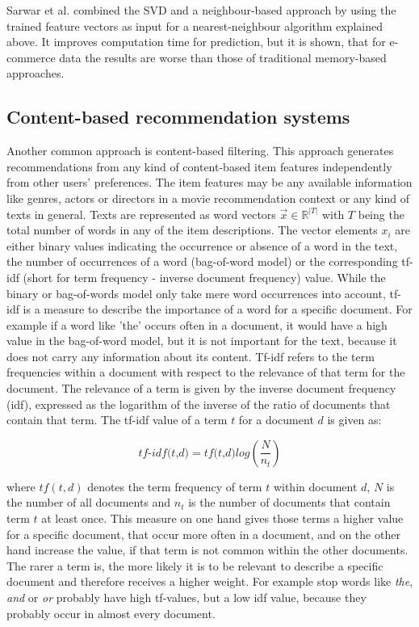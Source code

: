 \documentclass[10pt]{reportMaster}
\begin{document}
Sarwar et al. \cite{nnOnSvd} combined the SVD and a neighbour-based approach by using the trained feature vectors as input for a nearest-neighbour algorithm explained above.
It improves computation time for prediction, but it is shown, that for e-commerce data the results are worse than those of traditional memory-based approaches.



\subsection{Content-based recommendation systems}
\label{rs_cb}

Another common approach is content-based filtering.
This approach generates recommendations from any kind of content-based item features independently from other users' preferences.
The item features may be any available information like genres, actors or directors in a movie recommendation context or any kind of texts in general.
Texts are represented as word vectors $\vec{x} \in \mathds{R}^{|T|}$ with $T$ being the total number of words in any of the item descriptions.
The vector elements $x_i$ are either binary values indicating the occurrence or absence of a word in the text, the number of occurrences of a word (bag-of-word model) or the corresponding tf-idf (short for term frequency - inverse document frequency) value.
While the binary or bag-of-words model only take mere word occurrences into account, tf-idf is a measure to describe the importance of a word for a specific document.
For example if a word like 'the' occurs often in a document, it would have a high value in the bag-of-word model, but it is not important for the text, because it does not carry any information about its content.
Tf-idf refers to the term frequencies within a document with respect to the relevance of that term for the document.
The relevance of a term is given by the inverse document frequency (idf), expressed as the logarithm of the inverse of the ratio of documents that contain that term.
The tf-idf value of a term $t$ for a document $d$ is given as:

\begin{equation}
	\textit{tf-idf(t,d)} = \textit{tf(t,d)} log(\frac{N}{n_t})
\end{equation}

where $tf(t,d)$ denotes the term frequency of term $t$ within document $d$, $N$ is the number of all documents and $n_t$ is the number of documents that contain term $t$ at least once. 
This measure on one hand gives those terms a higher value for a specific document, that occur more often in a document, and on the other hand increase the value, if that term is not common within the other documents.
The rarer a term is, the more likely it is to be relevant to describe a specific document and therefore receives a higher weight.
For example stop words like \textit{the}, \textit{and} or \textit{or} probably have high tf-values, but a low idf value, because they probably occur in almost every document.
\end{document}
